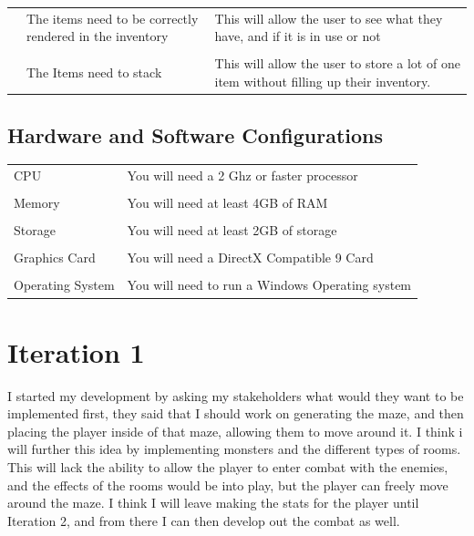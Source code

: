 \documentclass[12pt]{article}
\begin{document}
\begin{tabularx}{\linewidth}{XXX}
                        & The items need to be correctly rendered in the inventory                                           & This will allow the user to see what they have, and if it is in use or not                                                                                                                                                                         \\\\
                        & The Items need to stack                                                                            & This will allow the user to store a lot of one item without filling up their inventory.                                                                                                                                                           
\end{tabularx}
		
		
		
		
		
		\subsection{Hardware and Software Configurations}
		

\begin{tabularx}{\linewidth}{XX}
CPU              & You will need a 2 Ghz or faster processor       \\\\
Memory           & You will need at least 4GB of RAM               \\\\
Storage          & You will need at least 2GB of storage           \\\\
Graphics Card    & You will need a DirectX Compatible 9 Card       \\\\
Operating System & You will need to run a Windows Operating system
\end{tabularx}





\section{Iteration 1}

I started my development by asking my stakeholders what would they want to be implemented first, they said that I should work on generating the maze, and then placing the player inside of that maze, allowing them to move around it. I think i will further this idea by implementing monsters and the different types of rooms. This will lack the ability to allow the player to enter combat with the enemies, and the effects of the rooms would be into play, but the player can freely move around the maze. I think I will leave making the stats for the player until Iteration 2, and from there I can then develop out the combat as well. 
\end{document}
